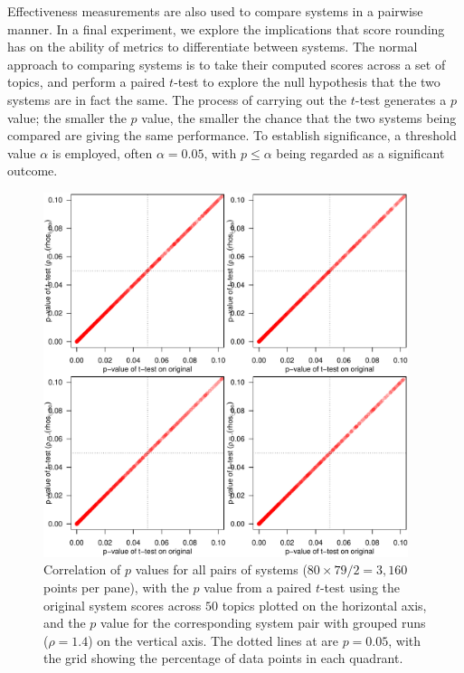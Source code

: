 
Effectiveness measurements are also used to compare systems in a
pairwise manner.
In a final experiment, we explore the implications that score
rounding has on the ability of metrics to differentiate between
systems.
The normal approach to comparing systems is to take their computed
scores across a set of topics, and perform a paired $t$-test to
explore the null hypothesis that the two systems are in fact the
same.
The process of carrying out the $t$-test generates a $p$ value; the
smaller the $p$ value, the smaller the chance that the two systems
being compared are giving the same performance.
To establish significance, a threshold value $\alpha$ is employed,
often $\alpha=0.05$, with $p\le\alpha$ being regarded as a
significant outcome.

\begin{figure}[t!]
\centering
\includegraphics[width=0.95\textwidth,page=5]{figs/p_value_scatter_sys_pairs.pdf}
\caption{Correlation of $p$ values for all pairs of systems
($80\times79/2=3{,}160$ points per pane), with the $p$ value from a
paired $t$-test using the original system scores across $50$ topics
plotted on the horizontal axis, and the $p$ value for the
corresponding system pair with grouped runs ($\rho=1.4$) on the
vertical axis.
The dotted lines at are $p=0.05$, with the grid showing the
percentage of data points in each quadrant.
\label{fig-pair-variation}}
\end{figure}

